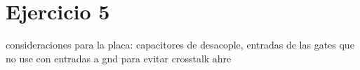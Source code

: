 \documentclass[../../e3_tp2_main.tex]{subfiles}
\begin{document}
\chapter{Ejercicio 5}

consideraciones para la placa: capacitores de desacople, entradas de las gates que no use con entradas a gnd para evitar crosstalk ahre
\end{document}
